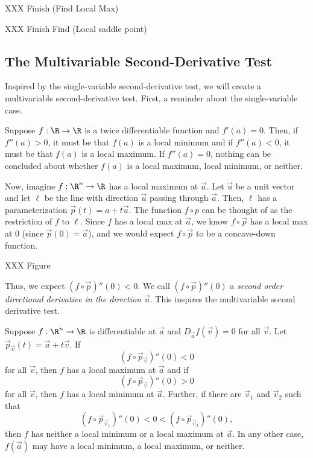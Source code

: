 \begin{example}
	XXX Finish (Find Local Max)
\end{example}

\begin{example}
	XXX Finish Find (Local saddle point)
\end{example}


\subsection{The Multivariable Second-Derivative Test}

Inspired by the single-variable second-derivative test, we will
create a multivariable second-derivative test.  First, a reminder about
the single-variable case.

\begin{theorem}
	Suppose $f:\R\to\R$ is a twice differentiable function and 
	$f'(a)=0$.  Then, if $f''(a)>0$, it must be that $f(a)$ is a local
	minimum and if $f''(a) < 0$, it must be that $f(a)$ is a local maximum.
	If $f''(a)=0$, nothing can be concluded about whether $f(a)$ is a
	local maximum, local minimum, or neither.
\end{theorem}

Now, imagine $f:\R^n\to\R$ has a local maximum at $\vec a$.  Let $\vec u$
be a unit vector and let $\ell$ be the line with direction $\vec u$
passing through $\vec a$.  Then, $\ell$ has a parameterization $\vec p(t)=a+t\vec u$.
The function $f\circ p$ can be thought of as the restriction of $f$ to $\ell$.
Since $f$ has a local max at $\vec a$, we know $f\circ \vec p$ has a local max at $0$
(since $\vec p(0)=\vec a$), and we would expect $f\circ \vec p$ to be a concave-down
function.

XXX Figure

Thus, we expect $(f\circ \vec p)''(0) < 0$.  We call $(f\circ \vec p)''(0)$ a
\emph{second order directional derivative in the direction $\vec u$}.  This inspires
the multivariable second derivative test.

\begin{theorem}
	Suppose $f:\R^n\to\R$ is differentiable at $\vec a$ and
	$D_{\vec a} f(\vec v)=0$ for all $\vec v$.  Let $\vec p_{\vec v}(t) = \vec a+t\vec v$.
	If 
	\[
		(f\circ \vec p_{\vec v})''(0) < 0
	\]
	for all $\vec v$, then $f$ has a local maximum at $\vec a$ and if
	\[
		(f\circ \vec p_{\vec v})''(0) > 0
	\]
	for all $\vec v$, then $f$ has a local minimum at $\vec a$.  Further, if
	there are $\vec v_1$ and $\vec v_2$ such that
	\[
		(f\circ \vec p_{\vec v_1})''(0) < 0 < (f\circ \vec p_{\vec v_2})''(0),
	\]
	then $f$ has neither a local minimum or a local maximum at $\vec a$.  In any
	other case, $f(\vec a)$ may have a local minimum, a local maximum, or neither.
\end{theorem}

